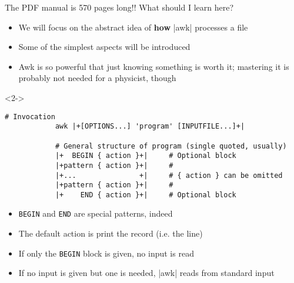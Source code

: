 \begin{frame}[fragile]{The PDF manual is 570 pages long!! What should I learn here?}
    \vspace{-4mm}
    \begin{itemize}
        \item We will focus on the abstract idea of \textbf{how} \bash|awk| processes a file
        \item Some of the simplest aspects will be introduced
        \item Awk is so powerful that just knowing something is worth it; mastering it is probably not needed for a physicist, though
    \end{itemize}
    \begin{uncoverenv}<2->
        \begin{lstlisting}[style=MyBash, numbers=none, aboveskip=2mm, belowskip=-5mm]
            # Invocation
            awk |+[OPTIONS...] 'program' [INPUTFILE...]+|

            # General structure of program (single quoted, usually)
            |+  BEGIN { action }+|     # Optional block
            |+pattern { action }+|     #
            |+...               +|     # { action } can be omitted
            |+pattern { action }+|     #
            |+    END { action }+|     # Optional block
        \end{lstlisting}
    \end{uncoverenv}
    \begin{itemize}[<3>]
        \item \texttt{BEGIN} and \texttt{END} are special patterns, indeed
        \item The default action is print the record (i.e. the line)
        \item If only the \texttt{BEGIN} block is given, no input is read
        \item If no input is given but one is needed, \bash|awk| reads from standard input
    \end{itemize}
\end{frame}

